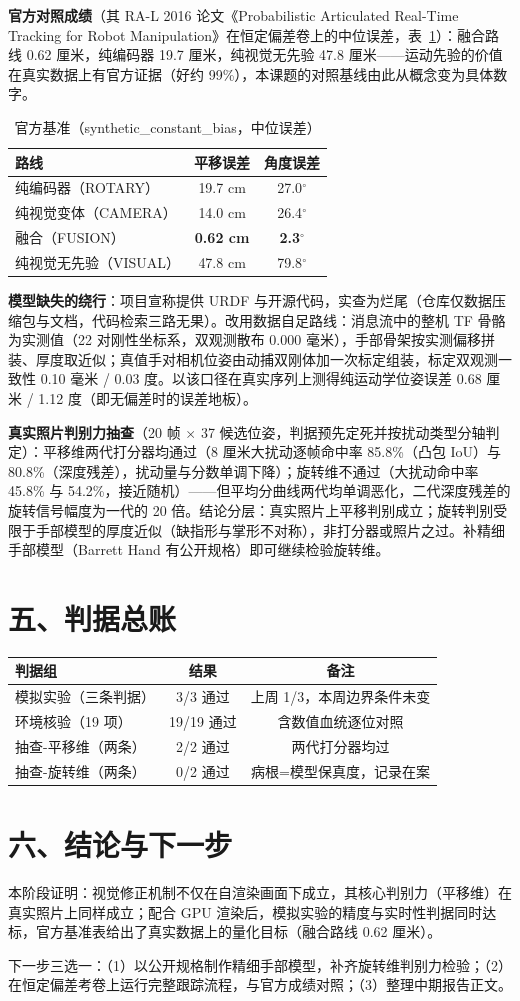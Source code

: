 \documentclass{article}
\begin{document}
\textbf{官方对照成绩}（其 RA-L 2016 论文《Probabilistic Articulated Real-Time Tracking for Robot Manipulation》在恒定偏差卷上的中位误差，表~\ref{tab:ra}）：融合路线 0.62 厘米，纯编码器 19.7 厘米，纯视觉无先验 47.8 厘米——运动先验的价值在真实数据上有官方证据（好约 99\%），本课题的对照基线由此从概念变为具体数字。

\begin{table}[h]\centering
\caption{官方基准（synthetic\_constant\_bias，中位误差）}
\label{tab:ra}
\begin{tabular}{lcc}
\toprule
路线 & 平移误差 & 角度误差 \\
\midrule
纯编码器（ROTARY） & 19.7 cm & 27.0$^\circ$ \\
纯视觉变体（CAMERA） & 14.0 cm & 26.4$^\circ$ \\
融合（FUSION） & \textbf{0.62 cm} & \textbf{2.3$^\circ$} \\
纯视觉无先验（VISUAL） & 47.8 cm & 79.8$^\circ$ \\
\bottomrule
\end{tabular}
\end{table}

\textbf{模型缺失的绕行}：项目宣称提供 URDF 与开源代码，实查为烂尾（仓库仅数据压缩包与文档，代码检索三路无果）。改用数据自足路线：消息流中的整机 TF 骨骼为实测值（22 对刚性坐标系，双观测散布 0.000 毫米），手部骨架按实测偏移拼装、厚度取近似；真值手对相机位姿由动捕双刚体加一次标定组装，标定双观测一致性 0.10 毫米 / 0.03 度。以该口径在真实序列上测得纯运动学位姿误差 0.68 厘米 / 1.12 度（即无偏差时的误差地板）。

\textbf{真实照片判别力抽查}（20 帧 $\times$ 37 候选位姿，判据预先定死并按扰动类型分轴判定）：平移维两代打分器均通过（8 厘米大扰动逐帧命中率 85.8\%（凸包 IoU）与 80.8\%（深度残差），扰动量与分数单调下降）；旋转维不通过（大扰动命中率 45.8\% 与 54.2\%，接近随机）——但平均分曲线两代均单调恶化，二代深度残差的旋转信号幅度为一代的 20 倍。结论分层：真实照片上平移判别成立；旋转判别受限于手部模型的厚度近似（缺指形与掌形不对称），非打分器或照片之过。补精细手部模型（Barrett Hand 有公开规格）即可继续检验旋转维。

\section{五、判据总账}
\begin{table}[h]\centering
\begin{tabular}{lcc}
\toprule
判据组 & 结果 & 备注 \\
\midrule
模拟实验（三条判据） & 3/3 通过 & 上周 1/3，本周边界条件未变 \\
环境核验（19 项） & 19/19 通过 & 含数值血统逐位对照 \\
抽查-平移维（两条） & 2/2 通过 & 两代打分器均过 \\
抽查-旋转维（两条） & 0/2 通过 & 病根=模型保真度，记录在案 \\
\bottomrule
\end{tabular}
\end{table}

\section{六、结论与下一步}
本阶段证明：视觉修正机制不仅在自渲染画面下成立，其核心判别力（平移维）在真实照片上同样成立；配合 GPU 渲染后，模拟实验的精度与实时性判据同时达标，官方基准表给出了真实数据上的量化目标（融合路线 0.62 厘米）。

下一步三选一：（1）以公开规格制作精细手部模型，补齐旋转维判别力检验；（2）在恒定偏差考卷上运行完整跟踪流程，与官方成绩对照；（3）整理中期报告正文。
\end{document}
